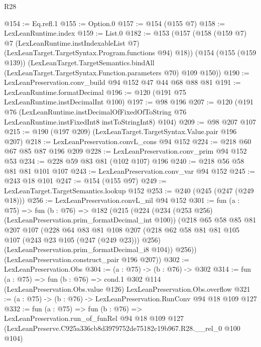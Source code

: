 \begin{lexlean}{R28}
\begin{coremodule}
@154 := Eq.refl.{1}
@155 := Option.{0}
@157 := @154 (@155 @7)
@158 := LexLeanRuntime.index
@159 := List.{0}
@182 := @153
    (@157
      (@158
        (@159 @7)
        @7
        (LexLeanRuntime.instIndexableList @7)
        (LexLeanTarget.TargetSyntax.Program.functions @94)
        @18))
    (@154
      (@155 (@159 @139))
      (LexLeanTarget.TargetSemantics.bindAll
        (LexLeanTarget.TargetSyntax.Function.parameters @70)
        @109
        @150))
@190 := LexLeanPreservation.conv_build @94 @152 @47 @44 @68 @88 @81
@191 := LexLeanRuntime.formatDecimal
@196 := @120 (@191 @75 LexLeanRuntime.instDecimalInt @100)
@197 := @98 @196
@207 := @120
    (@191
      @76
      (LexLeanRuntime.instDecimalOfFixedOfToString
        @76
        LexLeanRuntime.instFixedInt8
        instToStringInt8)
      @104)
@209 := @98 @207 @107
@215 := @190 (@197 @209) (LexLeanTarget.TargetSyntax.Value.pair @196 @207)
@218 := LexLeanPreservation.convL_cons @94 @152
@224 := @218 @60 @67 @85 @87 @196 @209
@228 := LexLeanPreservation.conv_prim @94 @152 @53
@234 := @228 @59 @83 @81 (@102 @107) @196
@240 := @218 @56 @58 @81 @81 @101 @107
@243 := LexLeanPreservation.conv_var @94 @152
@245 := @243 @18 @101
@247 := @154 (@155 @97)
@249 := LexLeanTarget.TargetSemantics.lookup @152
@253 := @240 (@245 (@247 (@249 @18)))
@256 := LexLeanPreservation.convL_nil @94 @152
@301 := fun (a : @75) =>
  fun (b : @76) =>
  @182
    (@215
      (@224
        (@234 (@253 @256) (LexLeanPreservation.prim_formatDecimal_int @100))
        (@218
          @65
          @58
          @85
          @81
          @207
          @107
          (@228
            @64
            @83
            @81
            @108
            @207
            (@218 @62 @58 @81 @81 @105 @107 (@243 @23 @105 (@247 (@249 @23))) @256)
            (LexLeanPreservation.prim_formatDecimal_i8 @104))
          @256))
      (LexLeanPreservation.construct_pair @196 @207))
@302 := LexLeanPreservation.Obs
@304 := (a : @75) -> (b : @76) -> @302
@314 := fun (a : @75) =>
  fun (b : @76) =>
  cond.{1} @302 @114 (LexLeanPreservation.Obs.value @126) LexLeanPreservation.Obs.overflow
@321 := (a : @75) -> (b : @76) -> LexLeanPreservation.RunConv @94 @18 @109 @127
@332 := fun (a : @75) =>
  fun (b : @76) =>
  LexLeanPreservation.run_of_funRel
    @94
    @18
    @109
    @127
    (LexLeanPreserve.C925a336cb8d3979752de75182c19b967.R28.__rel_0 @100 @104)
\end{coremodule}
\end{lexlean}
